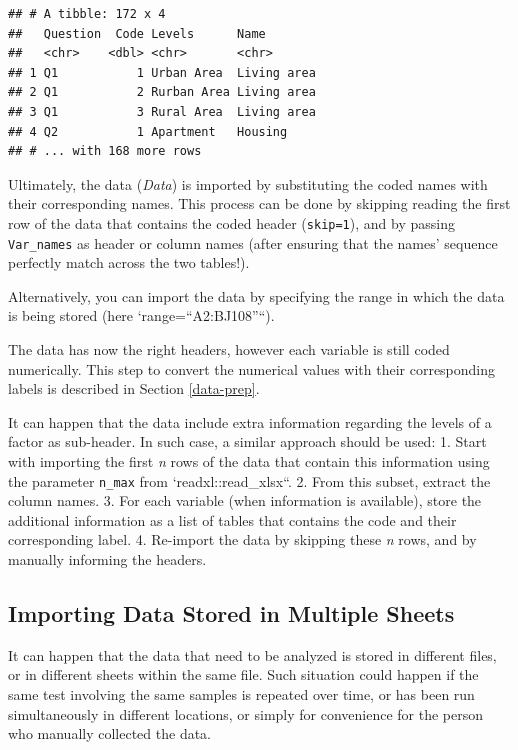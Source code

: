 \documentclass[
]{krantz}
\renewenvironment{quote}{\begin{VF}}{\end{VF}}
\begin{document}
\begin{verbatim}
## # A tibble: 172 x 4
##   Question  Code Levels      Name       
##   <chr>    <dbl> <chr>       <chr>      
## 1 Q1           1 Urban Area  Living area
## 2 Q1           2 Rurban Area Living area
## 3 Q1           3 Rural Area  Living area
## 4 Q2           1 Apartment   Housing    
## # ... with 168 more rows
\end{verbatim}

Ultimately, the data (\emph{Data}) is imported by substituting the coded names with their corresponding names. This process can be done by skipping reading the first row of the data that contains the coded header (\texttt{skip=1}), and by passing \texttt{Var\_names} as header or column names (after ensuring that the names' sequence perfectly match across the two tables!).

Alternatively, you can import the data by specifying the range in which the data is being stored (here `range=``A2:BJ108''``).

The data has now the right headers, however each variable is still coded numerically. This step to convert the numerical values with their corresponding labels is described in Section \ref{data-prep}.

\begin{quote}
It can happen that the data include extra information regarding the levels of a factor as sub-header. In such case, a similar approach should be used:
1. Start with importing the first \emph{n} rows of the data that contain this information using the parameter \texttt{n\_max} from `readxl::read\_xlsx``.
2. From this subset, extract the column names.
3. For each variable (when information is available), store the additional information as a list of tables that contains the code and their corresponding label.
4. Re-import the data by skipping these \emph{n} rows, and by manually informing the headers.
\end{quote}

\hypertarget{import-mult-sheet}{%
\subsection{Importing Data Stored in Multiple Sheets}\label{import-mult-sheet}}

It can happen that the data that need to be analyzed is stored in different files, or in different sheets within the same file. Such situation could happen if the same test involving the same samples is repeated over time, or has been run simultaneously in different locations, or simply for convenience for the person who manually collected the data.
\end{document}
